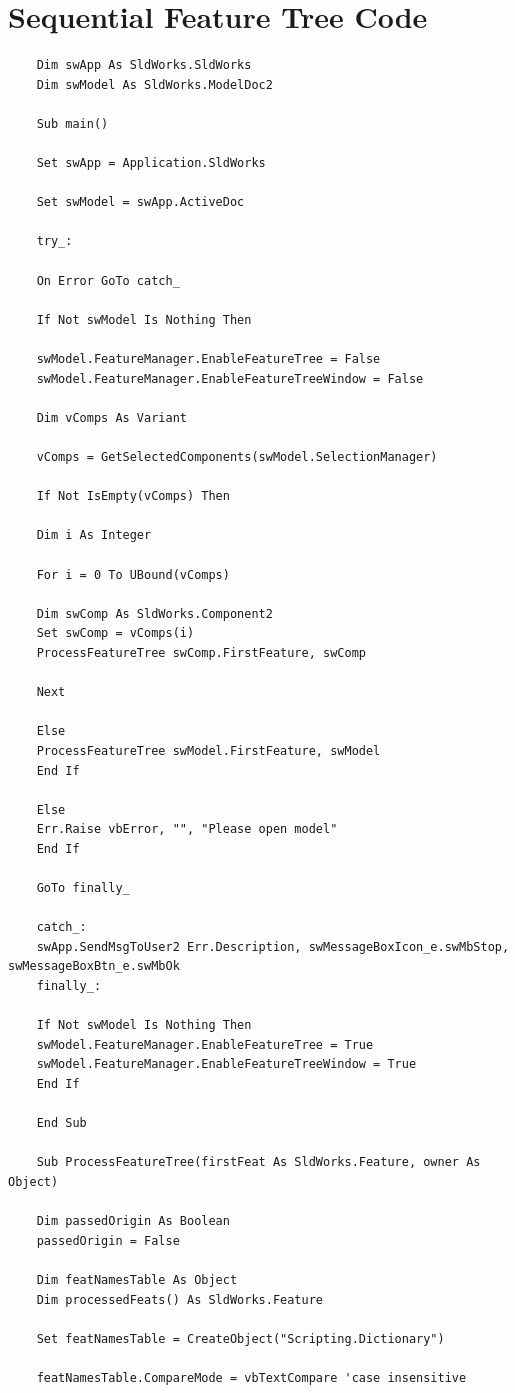 \documentclass[12pt,letterpaper,final]{report}
\begin{document}
\chapter{Sequential Feature Tree Code}

\begin{lstlisting}
	Dim swApp As SldWorks.SldWorks
	Dim swModel As SldWorks.ModelDoc2
	
	Sub main()
	
	Set swApp = Application.SldWorks
	
	Set swModel = swApp.ActiveDoc
	
	try_:
	
	On Error GoTo catch_
	
	If Not swModel Is Nothing Then
	
	swModel.FeatureManager.EnableFeatureTree = False
	swModel.FeatureManager.EnableFeatureTreeWindow = False
	
	Dim vComps As Variant
	
	vComps = GetSelectedComponents(swModel.SelectionManager)
	
	If Not IsEmpty(vComps) Then
	
	Dim i As Integer
	
	For i = 0 To UBound(vComps)
	
	Dim swComp As SldWorks.Component2
	Set swComp = vComps(i)
	ProcessFeatureTree swComp.FirstFeature, swComp
	
	Next
	
	Else
	ProcessFeatureTree swModel.FirstFeature, swModel
	End If
	
	Else
	Err.Raise vbError, "", "Please open model"
	End If
	
	GoTo finally_
	
	catch_:
	swApp.SendMsgToUser2 Err.Description, swMessageBoxIcon_e.swMbStop, swMessageBoxBtn_e.swMbOk
	finally_:
	
	If Not swModel Is Nothing Then
	swModel.FeatureManager.EnableFeatureTree = True
	swModel.FeatureManager.EnableFeatureTreeWindow = True
	End If
	
	End Sub
	
	Sub ProcessFeatureTree(firstFeat As SldWorks.Feature, owner As Object)
	
	Dim passedOrigin As Boolean
	passedOrigin = False
	
	Dim featNamesTable As Object
	Dim processedFeats() As SldWorks.Feature
	
	Set featNamesTable = CreateObject("Scripting.Dictionary")
	
	featNamesTable.CompareMode = vbTextCompare 'case insensitive
	

\end{lstlisting}
\end{document}
